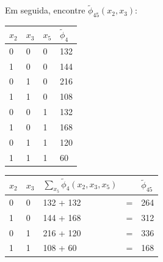 \begin{exenumerate}
\begin{solution}
        Em seguida, encontre $\tilde{\phi}_{45}(x_2, x_3)$:
        \begin{center}
            \begin{tabular}{llll}
                \toprule
                $x_2$ & $x_3$ & $x_5$ & $\tilde{\phi}_4$\\
                \midrule
                0 & 0 & 0 & 132 \\
                1 & 0 & 0 & 144 \\
                0 & 1 & 0 & 216 \\
                1 & 1 & 0 & 108 \\
                0 & 0 & 1 & 132 \\
                1 & 0 & 1 & 168 \\
                0 & 1 & 1 & 120 \\
                1 & 1 & 1 & 60 \\
                \bottomrule
            \end{tabular}
            \hspace{3ex}  \hspace{3ex}
            \begin{tabular}{lllll}
                \toprule
                $x_2$ & $x_3$ & $\sum_{x_5} \tilde{\phi}_4(x_2, x_3, x_5)$ &  & $\tilde{\phi}_{45}$\\
                \midrule
                0 & 0 & 132 + 132 & = & 264 \\
                1 & 0 & 144 + 168 & = & 312 \\
                0 & 1 & 216 + 120 & = & 336 \\
                1 & 1 & 108 + 60  & = & 168 \\
                \bottomrule
            \end{tabular}
        \end{center}
        

\end{solution}
\end{exenumerate}
